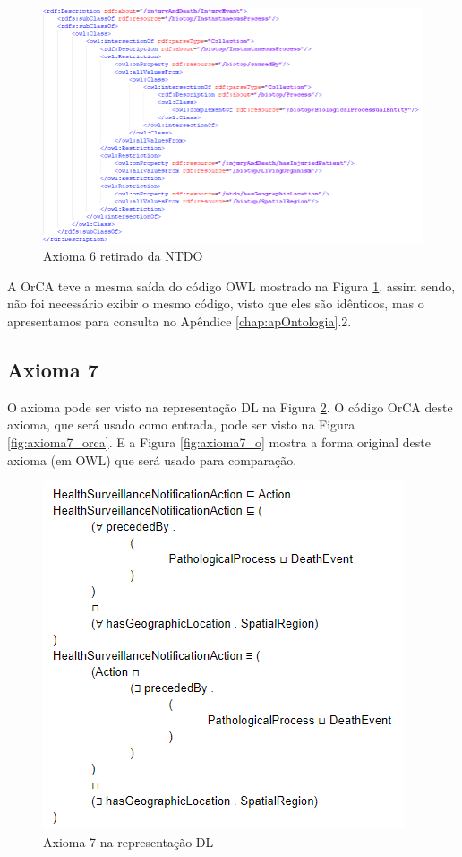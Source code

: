 \documentclass{bcc}
\begin{document}
\begin{figure}[H]
\centering
\includegraphics[width=1\textwidth]{Figuras/axioma6_o.png}
\caption{Axioma 6 retirado da NTDO} 
\label{fig:axioma6_o}
\end{figure}

A OrCA teve a mesma saída do código OWL mostrado na Figura \ref{fig:axioma6_o}, assim sendo, não foi necessário exibir o mesmo código, visto que eles são idênticos, mas o apresentamos para consulta no Apêndice \ref{chap:apOntologia}.2.

\subsection{Axioma 7}
O axioma pode ser visto na representação DL na Figura \ref{fig:axioma7_dl}. O código OrCA deste axioma, que será usado como entrada, pode ser visto na Figura \ref{fig:axioma7_orca}. E a Figura \ref{fig:axioma7_o} mostra a forma original deste axioma (em OWL) que será usado para comparação. 

\begin{figure}[H]
\centering
\includegraphics[width=.6\textwidth]{Figuras/axioma7_dl.png}
\caption{Axioma 7 na representação DL} 
\label{fig:axioma7_dl}
\end{figure}
\end{document}
